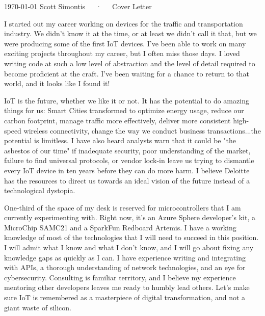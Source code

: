 \documentclass[11pt, letterpaper]{awesome-cv}
\begin{document}
\makecvheader[R]

\makecvfooter
  {\today}
  {Scott Simontis~~~·~~~Cover Letter}
  {}

\makelettertitle

\begin{cvletter}

I started out my career working on devices for the traffic and transportation industry. We didn't know it at the time, or at least we didn't call it that, but we were producing some of the first IoT devices. I've been able to work on many exciting projects throughout my career, but I often miss those days. I loved writing code at such a low level of abstraction and the level of detail required to become proficient at the craft. I've been waiting for a chance to return to that world, and it looks like I found it!

IoT is the future, whether we like it or not. It has the potential to do amazing things for us: Smart Cities transformed to optimize energy usage, reduce our carbon footprint, manage traffic more effectively, deliver more consistent high-speed wireless connectivity, change the way we conduct business transactions...the potential is limitless. I have also heard analysts warn that it could be "the asbestos of our time" if inadequate security, poor understanding of the market, failure to find universal protocols, or vendor lock-in leave us trying to dismantle every IoT device in ten years before they can do more harm. I believe Deloitte has the resources to direct us towards an ideal vision of the future instead of a technological dystopia.

One-third of the space of my desk is reserved for microcontrollers that I am currently experimenting with. Right now, it's an Azure Sphere developer's kit, a MicroChip SAMC21 and a SparkFun Redboard Artemis. I have a working knowledge of most of the technologies that I will need to succeed in this position. I will admit what I know and what I don't know, and I will go about fixing any knowledge gaps as quickly as I can. I have experience writing and integrating with APIs, a thorough understanding of network technologies, and an eye for cybersecurity. Consulting is familiar territory, and I believe my experience mentoring other developers leaves me ready to humbly lead others. Let's make sure IoT is remembered as a masterpiece of digital transformation, and not a giant waste of silicon.

\end{cvletter}


\makeletterclosing
\end{document}
